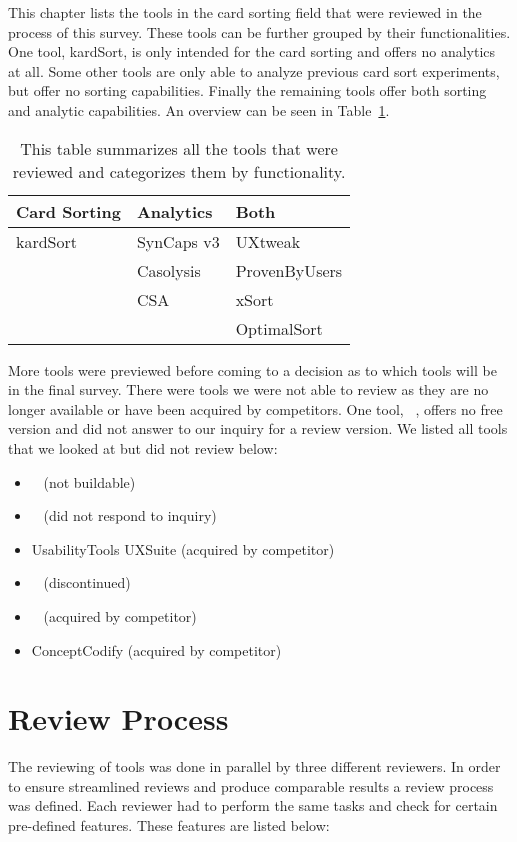 This chapter lists the tools in the card sorting field that were
reviewed in the process of this survey. These tools can be further
grouped by their functionalities. One tool, kardSort, is only intended
for the card sorting and offers no analytics at all. Some other tools
are only able to analyze previous card sort experiments, but offer no
sorting capabilities. Finally the remaining tools offer both sorting
and analytic capabilities. An overview can be seen in
Table~\ref{tab:reviewed-tools}.

\begin{table}[tp]
\centering
\begin{tabularx}
{\linewidth}{|X|X|X|}
\hline \textbf{Card Sorting} & \textbf{Analytics} & \textbf{Both}\\ 
\hline kardSort & SynCaps v3 & UXtweak \\ 
\hline & Casolysis & ProvenByUsers \\
\hline & CSA & xSort \\
\hline & & OptimalSort \\
\hline
\end{tabularx} 
\caption[Reviewed Tools] 
{ 
This table summarizes all the tools that were reviewed and categorizes
them by functionality.
}
\label{tab:reviewed-tools}
\end{table}


More tools were previewed before coming to a decision as to which
tools will be in the final survey. There were tools we were not able
to review as they are no longer available or have been acquired by
competitors. One tool, ~\textcite{UserZoom}, offers no free version
and did not answer to our inquiry for a review version. We listed all
tools that we looked at but did not review below:

\begin{itemize}
    \item ~\parencite{SortIt} (not buildable)
    \item ~\parencite{UserZoom} (did not respond to inquiry)
    \item UsabilityTools UXSuite (acquired by competitor)
    \item ~\parencite{SimpleCardSort} (discontinued)
    \item ~\parencite{usabiliTEST} (acquired by competitor)
    \item ConceptCodify (acquired by competitor)
\end{itemize}


\section{Review Process} The reviewing of tools was done in parallel
by three different  reviewers. In order to ensure streamlined reviews
and produce comparable results a review process was defined. Each
reviewer had to perform the same tasks and check for certain
pre-defined features. These features are listed below:

